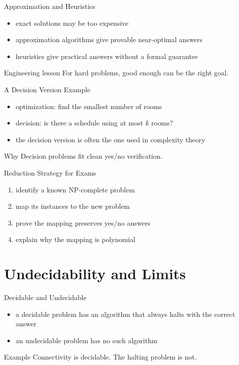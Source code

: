 \documentclass[aspectratio=169,xcolor=dvipsnames]{beamer}
\begin{document}
\begin{frame}{Approximation and Heuristics}
  \begin{itemize}
    \item exact solutions may be too expensive
    \item approximation algorithms give provable near-optimal answers
    \item heuristics give practical answers without a formal guarantee
  \end{itemize}
  \begin{exampleblock}{Engineering lesson}
    For hard problems, good enough can be the right goal.
  \end{exampleblock}
\end{frame}

\begin{frame}{A Decision Version Example}
  \begin{itemize}
    \item optimization: find the smallest number of rooms
    \item decision: is there a schedule using at most $k$ rooms?
    \item the decision version is often the one used in complexity theory
  \end{itemize}
  \begin{block}{Why}
    Decision problems fit clean yes/no verification.
  \end{block}
\end{frame}

\begin{frame}{Reduction Strategy for Exams}
  \begin{enumerate}
    \item identify a known NP-complete problem
    \item map its instances to the new problem
    \item prove the mapping preserves yes/no answers
    \item explain why the mapping is polynomial
  \end{enumerate}
\end{frame}

\section{Undecidability and Limits}
\begin{frame}{Decidable and Undecidable}
  \begin{itemize}
    \item a decidable problem has an algorithm that always halts with the correct answer
    \item an undecidable problem has no such algorithm
  \end{itemize}
  \begin{block}{Example}
    Connectivity is decidable. The halting problem is not.
  \end{block}
\end{frame}
\end{document}
